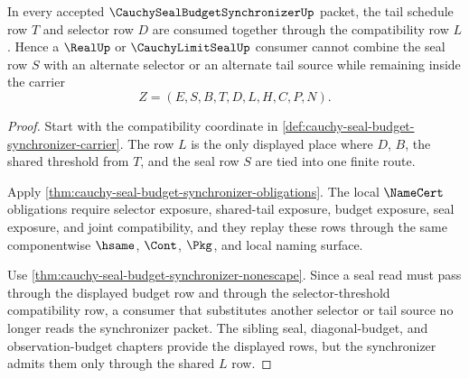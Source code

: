 \begin{theorem}
\label{thm:cauchy-seal-budget-synchronizer-tail-selector-compatibility}
In every accepted $\CauchySealBudgetSynchronizerUp$ packet, the tail schedule row $T$ and selector row $D$ are consumed together through the compatibility row $L$. Hence a $\RealUp$ or $\CauchyLimitSealUp$ consumer cannot combine the seal row $S$ with an alternate selector or an alternate tail source while remaining inside the carrier
$$
Z=(E,S,B,T,D,L,H,C,P,N).
$$
\end{theorem}
\begin{proof}
Start with the compatibility coordinate in \autoref{def:cauchy-seal-budget-synchronizer-carrier}. The row $L$ is the only displayed place where $D$, $B$, the shared threshold from $T$, and the seal row $S$ are tied into one finite route.

Apply \autoref{thm:cauchy-seal-budget-synchronizer-obligations}. The local $\NameCert$ obligations require selector exposure, shared-tail exposure, budget exposure, seal exposure, and joint compatibility, and they replay these rows through the same componentwise $\hsame$, $\Cont$, $\Pkg$, and local naming surface.

Use \autoref{thm:cauchy-seal-budget-synchronizer-nonescape}. Since a seal read must pass through the displayed budget row and through the selector-threshold compatibility row, a consumer that substitutes another selector or tail source no longer reads the synchronizer packet. The sibling seal, diagonal-budget, and observation-budget chapters provide the displayed rows, but the synchronizer admits them only through the shared $L$ row.
\end{proof}

